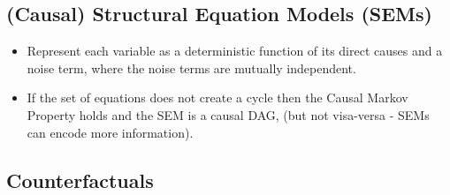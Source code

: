\documentclass[20pt]{extreport}
\begin{document}
\subsection*{(Causal) Structural Equation Models (SEMs)}
\begin{itemize}
\item Represent each variable as a deterministic function of its direct causes and a noise term, where the noise terms are mutually independent.

\item If the set of equations does not create a cycle then the Causal Markov Property holds and the SEM is a causal DAG, (but not visa-versa - SEMs can encode more information).
\end{itemize}


\subsection*{Counterfactuals}
\end{document}
